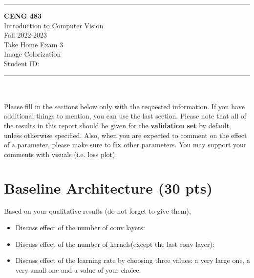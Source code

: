 \documentclass[12pt]{article}
\newcommand{\HRule}{\rule{\linewidth}{1mm}}
\begin{document}
\noindent
\HRule %
\small
\begin{center}
	\LARGE \textbf{CENG 483} \\[4mm]
	\Large Introduction to Computer Vision \\[4mm]
	\normalsize Fall 2022-2023 \\
	\Large Take Home Exam 3 \\
	\Large Image Colorization \\
    \Large Student ID: \\
\end{center}
\HRule

\begin{center}
\end{center}
\vspace{-10mm}
\noindent\\ \\ 
Please fill in the sections below only with the requested information. If you have additional things to mention, you can use the last section. Please note that all of the results in this report should be given for the \textbf{validation set} by default, unless otherwise specified. Also, when you are expected to comment on the effect of a parameter, please make sure to \textbf{fix} other parameters. You may support your comments with visuals (i.e. loss plot).

\section{Baseline Architecture (30 pts)}
    Based on your qualitative results (do not forget to give them),
    \begin{itemize}
        \item Discuss effect of the number of conv layers:
        \item Discuss effect of the number of kernels(except the last conv layer):
        \item Discuss effect of the learning rate by choosing three values: a very large one, a very small one and a value of your choice:

    \end{itemize}
\end{document}
